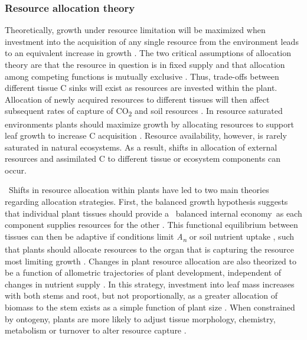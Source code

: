 \documentclass[a4paper]{article}\usepackage[]{graphicx}\usepackage[]{color}
\begin{document}
\subsubsection*{Resource allocation theory}
Theoretically, growth under resource limitation will be maximized when investment into the acquisition of any single resource from the environment leads to an equivalent increase in growth \citep{bloom1985resource}. The two critical assumptions of allocation theory are that the resource in question is in fixed supply and that allocation among competing functions is mutually exclusive \citep{bazzaz2000reproductive}. Thus, trade-offs between different tissue C sinks will exist as resources are invested within the plant. Allocation of newly acquired resources to different tissues will then affect subsequent rates of capture of CO\textsubscript{2} and soil resources \citep{shipley2002balanced}. In resource saturated environments plants should maximize growth by allocating resources to support leaf growth to increase C acquisition \citep{monsi2005factor}. Resource availability, however, is rarely saturated in natural ecosystems. As a result, shifts in allocation of external resources and assimilated C to different tissue or ecosystem components can occur.

\
Shifts in resource allocation within plants have led to two main theories regarding allocation strategies. First, the balanced growth hypothesis suggests that individual plant tissues should provide a \textquotesingle~balanced internal economy\textquotesingle~as each component supplies resources for the other \citep{davidson1969effect}. This functional equilibrium between tissues can then be adaptive if conditions limit \textit{A\textsubscript{n}} or soil nutrient uptake \citep{cannell1985attributes}, such that plants should allocate resources to the organ that is capturing the resource most limiting growth \citep{shipley2002balanced}. Changes in plant resource allocation are also theorized to be a function of allometric trajectories of plant development, independent of changes in nutrient supply \citep{muller2000effect}. In this strategy, investment into leaf mass increases with both stems and root, but not proportionally, as a greater allocation of biomass to the stem exists as a simple function of plant size \citep{zens2002sizing}. When constrained by ontogeny, plants are more likely to adjust tissue morphology, chemistry, metabolism or turnover to alter resource capture \citep{reich2002root}. 
\end{document}
